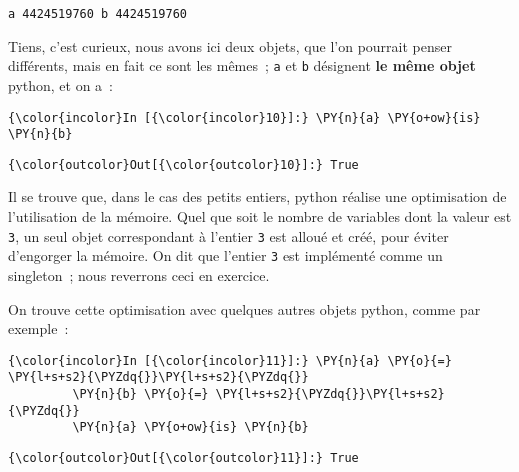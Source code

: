     \begin{Verbatim}[commandchars=\\\{\},frame=single,framerule=0.3mm,rulecolor=\color{cellframecolor}]
a 4424519760 b 4424519760
\end{Verbatim}

    Tiens, c'est curieux, nous avons ici deux objets, que l'on pourrait
penser différents, mais en fait ce sont les mêmes~; \texttt{a} et
\texttt{b} désignent \textbf{le même objet} python, et on a~:

    \begin{Verbatim}[commandchars=\\\{\},frame=single,framerule=0.3mm,rulecolor=\color{cellframecolor}]
{\color{incolor}In [{\color{incolor}10}]:} \PY{n}{a} \PY{o+ow}{is} \PY{n}{b}
\end{Verbatim}


\begin{Verbatim}[commandchars=\\\{\},frame=single,framerule=0.3mm,rulecolor=\color{cellframecolor}]
{\color{outcolor}Out[{\color{outcolor}10}]:} True
\end{Verbatim}
            
    Il se trouve que, dans le cas des petits entiers, python réalise une
optimisation de l'utilisation de la mémoire. Quel que soit le nombre de
variables dont la valeur est \texttt{3}, un seul objet correspondant à
l'entier \texttt{3} est alloué et créé, pour éviter d'engorger la
mémoire. On dit que l'entier \texttt{3} est implémenté comme un
singleton~; nous reverrons ceci en exercice.

    On trouve cette optimisation avec quelques autres objets python, comme
par exemple~:

    \begin{Verbatim}[commandchars=\\\{\},frame=single,framerule=0.3mm,rulecolor=\color{cellframecolor}]
{\color{incolor}In [{\color{incolor}11}]:} \PY{n}{a} \PY{o}{=} \PY{l+s+s2}{\PYZdq{}}\PY{l+s+s2}{\PYZdq{}}
         \PY{n}{b} \PY{o}{=} \PY{l+s+s2}{\PYZdq{}}\PY{l+s+s2}{\PYZdq{}}
         \PY{n}{a} \PY{o+ow}{is} \PY{n}{b}
\end{Verbatim}


\begin{Verbatim}[commandchars=\\\{\},frame=single,framerule=0.3mm,rulecolor=\color{cellframecolor}]
{\color{outcolor}Out[{\color{outcolor}11}]:} True
\end{Verbatim}
            
